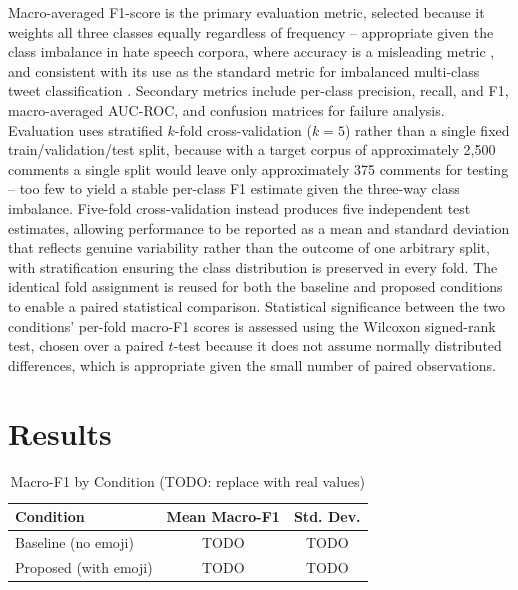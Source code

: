 \documentclass[journal]{IEEEtran}
\begin{document}
Macro-averaged F1-score is the primary evaluation metric, selected
because it weights all three classes equally regardless of frequency --
appropriate given the class imbalance in hate speech corpora, where
accuracy is a misleading metric \cite{muthuthanthri2024}, and consistent
with its use as the standard metric for imbalanced multi-class tweet
classification \cite{barbieri2020}. Secondary metrics include per-class
precision, recall, and F1, macro-averaged AUC-ROC, and confusion
matrices for failure analysis. Evaluation uses stratified $k$-fold cross-validation ($k=5$) rather than
a single fixed train/validation/test split, because with a target corpus
of approximately 2,500 comments a single split would leave only
approximately 375 comments for testing -- too few to yield a stable
per-class F1 estimate given the three-way class imbalance. Five-fold
cross-validation instead produces five independent test estimates,
allowing performance to be reported as a mean and standard deviation
that reflects genuine variability rather than the outcome of one
arbitrary split, with stratification ensuring the class distribution is
preserved in every fold. %
The identical fold assignment is reused for both the baseline and
proposed conditions to enable a paired statistical comparison. Statistical significance between
the two conditions' per-fold macro-F1 scores is assessed using the
Wilcoxon signed-rank test, chosen over a paired $t$-test because it does
not assume normally distributed differences, which is appropriate given
the small number of paired observations.

\section{Results}
\label{sec:results}


\begin{table}[h]
\centering
\caption{Macro-F1 by Condition (TODO: replace with real values)}
\label{tab:results}
\begin{tabular}{@{}lcc@{}}
\toprule
Condition & Mean Macro-F1 & Std. Dev. \\
\midrule
Baseline (no emoji) & TODO & TODO \\
Proposed (with emoji) & TODO & TODO \\
\bottomrule
\end{tabular}
\end{table}
\end{document}
